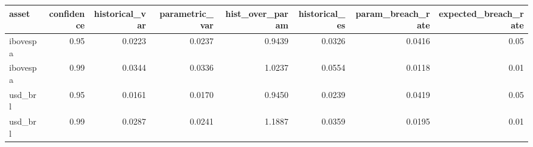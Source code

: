 
\begin{tabular}{lrrrrrrr}
\toprule
asset & confidence & historical\_var & parametric\_var & hist\_over\_param & historical\_es & param\_breach\_rate & expected\_breach\_rate\\
\midrule
ibovespa & 0.95 & 0.0223 & 0.0237 & 0.9439 & 0.0326 & 0.0416 & 0.05\\
ibovespa & 0.99 & 0.0344 & 0.0336 & 1.0237 & 0.0554 & 0.0118 & 0.01\\
usd\_brl & 0.95 & 0.0161 & 0.0170 & 0.9450 & 0.0239 & 0.0419 & 0.05\\
usd\_brl & 0.99 & 0.0287 & 0.0241 & 1.1887 & 0.0359 & 0.0195 & 0.01\\
\bottomrule
\end{tabular}
